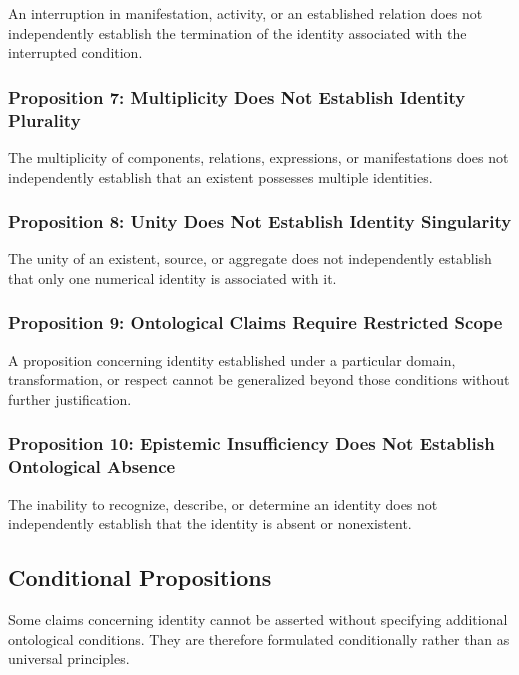 An interruption in manifestation, activity, or an
established relation does not independently establish
the termination of the identity associated with the
interrupted condition.

\subsubsection{Proposition 7: Multiplicity Does Not Establish Identity Plurality}

The multiplicity of components, relations, expressions,
or manifestations does not independently establish
that an existent possesses multiple identities.

\subsubsection{Proposition 8: Unity Does Not Establish Identity Singularity}

The unity of an existent, source, or aggregate does
not independently establish that only one numerical
identity is associated with it.

\subsubsection{Proposition 9: Ontological Claims Require Restricted Scope}

A proposition concerning identity established under
a particular domain, transformation, or respect cannot
be generalized beyond those conditions without further
justification.

\subsubsection{Proposition 10: Epistemic Insufficiency Does Not Establish Ontological Absence}

The inability to recognize, describe, or determine an
identity does not independently establish that the
identity is absent or nonexistent.


\subsection{Conditional Propositions}

Some claims concerning identity cannot be asserted
without specifying additional ontological conditions.
They are therefore formulated conditionally rather than
as universal principles.

